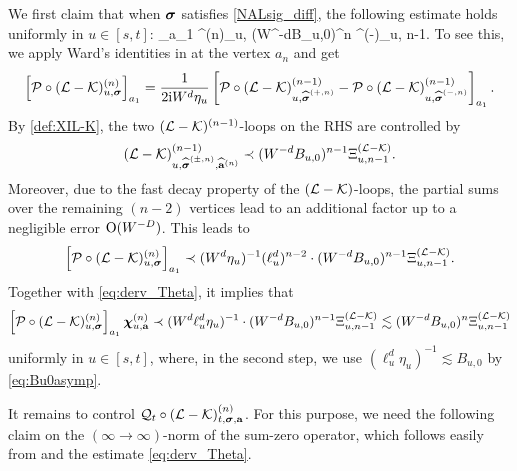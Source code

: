 We first claim that when $\bsig$ satisfies \eqref{NALsig_diff}, the following estimate holds uniformly in $u\in[s,t]$:
\be\label{eq:Ward_typeP}
_{a_1} \dthn^{(n)}_{u, \ba} \prec   (W^{-d}B_{u,0})^{n}  \Xi^{(-)}_{u, n-1}.
\ee
To see this, we apply Ward's identities in  at the vertex $a_n$ and get  
$$\left[\cal P\circ (\mathcal{L} - \mathcal{K})^{(n)}_{u, \bsig}\right]_{a_1}= \frac{1}{2\ii W^d \eta_u}\left[\cal P\circ (\mathcal{L} - \mathcal{K})^{(n-1)}_{u, \wh\bsig^{(+,n)}}-\cal P\circ (\mathcal{L} - \mathcal{K})^{(n-1)}_{u, \wh\bsig^{(-,n)}}\right]_{a_1}.$$
By \eqref{def:XIL-K}, the two $(\cL-\cK)^{(n-1)}$-loops on the RHS are controlled by 
$$(\mathcal{L} - \mathcal{K})^{(n-1)}_{u, \wh\bsig^{(\pm,n)},\wh \ba^{(n)}} \prec (W^{-d}B_{u,0})^{n-1}\Xi^{(\mathcal{L}-\mathcal{K})}_{u, n-1}.$$ Moreover, due to the fast decay property of the $(\cal L-\cal K)$-loops, the partial sums over the remaining $(n-2)$ vertices lead to an additional  factor up to a negligible error $\OO(W^{-D})$. This leads to
\begin{align}\label{jywiiwsoks}
 \left[\cal P\circ (\mathcal{L} - \mathcal{K})^{(n)}_{u, \bsig}\right]_{a_1}  \prec (W^d\eta_u)^{-1}(\ell_u^{d})^{n-2}\cdot (W^{-d}B_{u,0})^{n-1}   \Xi^{(\mathcal{L}-\mathcal{K})}_{u, n-1}.
\end{align}
Together with \eqref{eq:derv_Theta}, it implies that 
\begin{align*}
\left[\cal P\circ (\mathcal{L} - \mathcal{K})^{(n)}_{u, \bsig}\right]_{a_1} \dthn^{(n)}_{u, \ba} \prec (W^d\ell_u^d\eta_u)^{-1}\cdot (W^{-d}B_{u,0})^{n-1}\Xi^{(\mathcal{L}-\mathcal{K})}_{u, n-1} \lesssim (W^{-d}B_{u,0})^{n}\Xi^{(\mathcal{L}-\mathcal{K})}_{u, n-1} 
\end{align*}
uniformly in $u\in [s,t]$, where, in the second step, we use $(\ell_u^d\eta_u)^{-1}\lesssim B_{u,0}$ by \eqref{eq:Bu0asymp}.  



It remains to control ${\cal Q}_t \circ (\mathcal{L} - \mathcal{K})^{(n)}_{t, \bsig, \ba}$. For this purpose, we need the following claim on the $(\infty\to \infty)$-norm of the sum-zero operator, which follows easily from  and the estimate \eqref{eq:derv_Theta}.  

